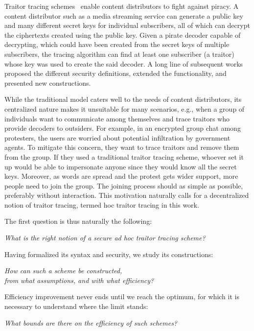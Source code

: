 Traitor tracing schemes~\cite{C:ChoFiaNao94} enable content distributors to fight against piracy.
A content distributor such as a media streaming service can generate a public key and many different secret keys for individual subscribers,
all of which can decrypt the ciphertexts created using the public key.
Given a pirate decoder capable of decrypting,
which could have been created from the secret keys of multiple subscribers,
the tracing algorithm can find at least one subscriber (a traitor) whose key was used to create the said decoder.
A long line of subsequent works~\cite{EC:BonSahWat06,CCS:BonWat06,CCS:BonNao08,C:BonZha14,EC:NisWicZha16,STOC:GoyKopWat18,C:GKRW18,TCC:CVWWW18,C:GQWW19,TCC:GoyKopWat19,C:Zhandry20,C:Zhandry21} proposed the different security definitions, extended the functionality, and presented new constructions.

While the traditional model caters well to the needs of content distributors,
its centralized nature makes it unsuitable for many scenarios,
e.g., when a group of individuals want to communicate among themselves and
trace traitors who provide decoders to outsiders.
For example,
in an encrypted group chat among protesters,
the users are worried about potential infiltration by government agents.
To mitigate this concern,
they want to trace traitors and remove them from the group.
If they used a traditional traitor tracing scheme,
whoever set it up would be able to impersonate anyone
since they would know all the secret keys.
Moreover, as words are spread and the protest gets wider support,
more people need to join the group.
The joining process should as simple as possible,
preferably without interaction.
This motivation naturally calls for a decentralized notion of traitor tracing, termed \ad hoc traitor tracing in this work.

The first question is thus naturally the following:
\begin{center}
\itshape
What is the right notion of a secure ad hoc traitor tracing scheme?\\
\end{center}
Having formalized its syntax and security,
we study its constructions:
\begin{center}
\itshape
How can such a scheme be constructed,\\
from what assumptions, and with what efficiency?
\end{center}
Efficiency improvement never ends until we reach the optimum,
for which it is necessary to understand where the limit stands:
\begin{center}
\itshape
What bounds are there on the efficiency of such schemes?
\end{center}
